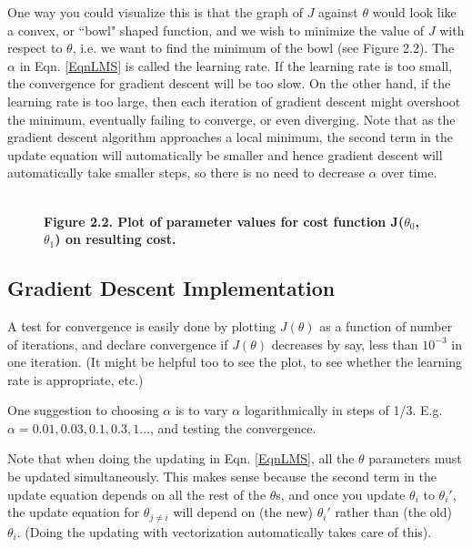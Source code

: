 \documentclass[letterpaper,10pt]{article}
\begin{document}
One way you could visualize this is that the graph of $J$ against $\theta$ would look like a convex, or ``bowl" shaped function, and we wish to minimize the value of $J$ with respect to $\theta$, i.e. we want to find the minimum of the bowl (see Figure 2.2). The $\alpha$ in Eqn. \ref{EqnLMS} is called the learning rate. If the learning rate is too small, the convergence for gradient descent will be too slow. On the other hand, if the learning rate is too large, then each iteration of gradient descent might overshoot the minimum, eventually failing to converge, or even diverging. Note that as the gradient descent algorithm approaches a local minimum, the second term in the update equation will automatically be smaller and hence gradient descent will automatically take smaller steps, so there is no need to decrease $\alpha$ over time.
\begin{figure} %
\centering
{}\\
{\bf Figure 2.2. Plot of parameter values for cost function J($\theta_0$,$\theta_1$) on resulting cost.}
\end{figure}

\subsection{Gradient Descent Implementation}

A test for convergence is easily done by plotting $J(\theta)$ as a function of number of iterations, and declare convergence if $J(\theta)$ decreases by say, less than $10^{-3}$ in one iteration. (It might be helpful too to see the plot, to see whether the learning rate is appropriate, etc.)

One suggestion to choosing $\alpha$ is to vary $\alpha$ logarithmically in steps of 1/3. E.g. $\alpha = 0.01, 0.03, 0.1, 0.3, 1 \ldots$, and testing the convergence.

Note that when doing the updating in Eqn. \ref{EqnLMS}, all the $\theta$ parameters must be updated simultaneously. This makes sense because the second term in the update equation depends on all the rest of the $\theta$s, and once you update $\theta_i$ to $\theta_i'$, the update equation for $\theta_{j\neq i}$ will depend on (the new) $\theta_i'$ rather than (the old) $\theta_i$. (Doing the updating with vectorization automatically takes care of this). 
\end{document}
